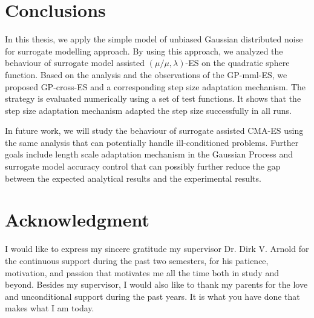 







\section{Conclusions}
In this thesis, we apply the simple model \cite{DBLP:conf/ppsn/KayhaniA18} of unbiased Gaussian distributed noise for surrogate modelling  approach. By using this approach, we analyzed the behaviour of surrogate model assisted $(\mu/\mu,\lambda)$-ES on the quadratic sphere function. Based on the analysis and the observations of the GP-mml-ES, we proposed GP-cross-ES and a corresponding step size adaptation mechanism. The strategy is evaluated numerically using a set of test functions. It shows that the step size adaptation mechanism adapted the step size successfully in all runs.

In future work, we will study the behaviour of surrogate assisted CMA-ES using the same analysis that can potentially handle ill-conditioned problems. Further goals include length scale adaptation mechanism in the Gaussian Process and surrogate model accuracy control that can possibly further reduce the gap between the expected analytical results and the experimental results. 

\section*{Acknowledgment}
I would like to express my sincere gratitude my supervisor Dr. Dirk V. Arnold for the continuous support during the past two semesters, for his patience, motivation, and passion  that motivates me all the time both in study and beyond. Besides my supervisor, I would also like to thank my parents for the love and unconditional support during the past years. It is what you have done that makes what I am today.



